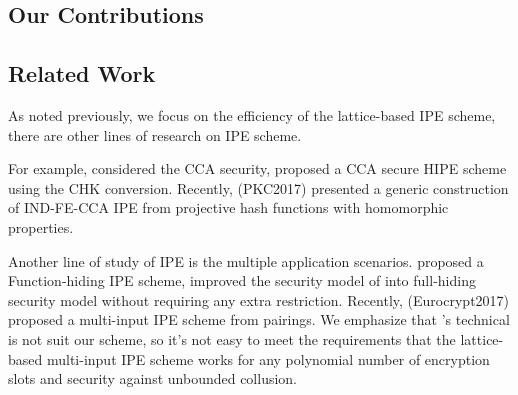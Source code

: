 \subsection{Our Contributions}





















\subsection{Related Work}
As noted previously, we focus on the efficiency of the lattice-based IPE scheme, there are other lines of research on IPE scheme.\

For example, considered the CCA security, \cite{LC:AbdDeCMoc12} proposed a CCA secure HIPE scheme using the CHK conversion\cite{Boneh2007Chosen}. Recently, \cite{cryptoeprint:2017:038}(PKC2017) presented a generic construction of IND-FE-CCA IPE from projective hash functions with homomorphic properties.\

Another line of study of IPE is the multiple application scenarios. \cite{AC:BisJaiKow15} proposed a Function-hiding IPE scheme, \cite{PKC:DatDutMuk16} improved the security model of \cite{AC:BisJaiKow15} into full-hiding security model without requiring any extra restriction. Recently, \cite{cryptoeprint:2016:425}(Eurocrypt2017) proposed a multi-input IPE scheme from pairings. We emphasize that \cite{cryptoeprint:2016:425}'s technical is not suit our scheme, so it's not easy to meet the requirements that the lattice-based multi-input IPE scheme works for any polynomial number of encryption slots and security against unbounded collusion.




